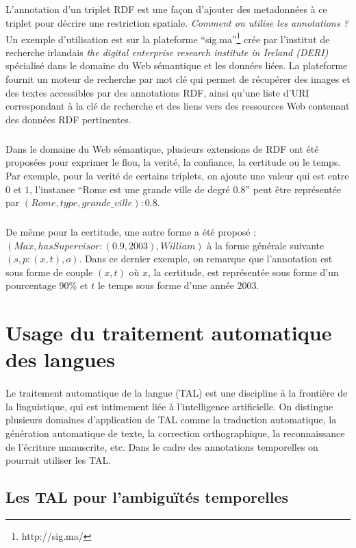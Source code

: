 \subparagraph{}
L'annotation d'un triplet RDF est une façon d'ajouter des metadonnées à ce triplet pour décrire une restriction spatiale.
\newline
\textit{Comment on utilise les annotations ?} Un exemple d'utilisation est sur la plateforme ``sig.ma''\footnote{http://sig.ma/} crée par l'institut de recherche irlandais \textit{the digital enterprise research institute in Ireland (DERI)} spécialisé dans le domaine du Web sémantique et les données liées. La plateforme fournit un moteur de recherche par mot clé qui permet de récupérer des images et des textes accessibles par des annotations RDF, ainsi qu'une liste d'URI correspondant à la clé de recherche et des liens vers des ressources Web contenant des données RDF pertinentes.
\subparagraph{}
Dans le domaine du Web sémantique, plusieurs extensions de RDF ont été proposées pour exprimer le flou, la verité, la confiance, la certitude ou le temps.
Par exemple, pour la verité de certains triplets, on ajoute une valeur qui est entre $0$ et $1$, l’instance “Rome est une grande ville de degré 0.8” peut être représentée par $(Rome, type,grande{\_}ville) : 0.8$.
\subparagraph{}
De même pour la certitude, une autre forme a été proposé :
\newline
$(Max,hasSupervisor : (0.9,2003),William)$ à la forme générale suivante $(s, p : (x,t),o)$.
Dans ce dernier exemple, on remarque que l'annotation est sous forme de couple $(x, t)$ où $x$, la certitude, est représentée sous forme d'un pourcentage 90\% et $t$ le temps sous forme d'une année $2003$.
\section{Usage du traitement automatique des langues}
\paragraph{}
Le traitement automatique de la langue (TAL) est une discipline à la frontière de la linguistique, qui est intimement liée à l'intelligence artificielle.
On distingue plusieurs domaines d'application de TAL comme la traduction automatique, la génération automatique de texte, la correction orthographique, la reconnaissance de l'écriture manuscrite, etc.
Dans le cadre des annotations temporelles on pourrait utiliser les TAL.
\subsection{Les TAL pour l'ambiguïtés temporelles}
